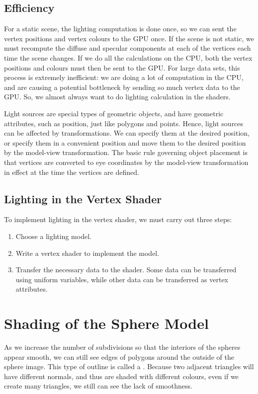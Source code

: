 \documentclass[../COS3712_Notes.tex]{subfiles}
\begin{document}
      \subsection{Efficiency}
        For a static scene, the lighting computation is done once, so we can sent the vertex
        positions and vertex colours to the GPU once.
        If the scene is not static, we must recompute the diffuse and specular components
        at each of the vertices each time the scene changes.
        If we do all the calculations on the CPU, both the vertex positions and colours
        must then be sent to the GPU.
        For large data sets, this process is extremely inefficient:
        we are doing a lot of computation in the CPU, and are causing a potential bottleneck
        by sending so much vertex data to the GPU.
        So, we almost always want to do lighting calculation in the shaders.

        Light sources are special types of geometric objects, and have geometric attributes,
        such as position, just like polygons and points.
        Hence, light sources can be affected by transformations.
        We can specify them at the desired position, or specify them in a convenient position
        and move them to the desired position by the model-view transformation.
        The basic rule governing object placement is that vertices are converted to eye
        coordinates by the model-view transformation in effect at the time the vertices
        are defined.

      \subsection{Lighting in the Vertex Shader}
        To implement lighting in the vertex shader, we must carry out three steps:
        \begin{enumerate}[nosep]
          \item Choose a lighting model.
          \item Write a vertex shader to implement the model.
          \item Transfer the necessary data to the shader.
            Some data can be transferred using uniform variables,
            while other data can be transferred as vertex attributes.
        \end{enumerate}

    \section{Shading of the Sphere Model}
      As we increase the number of subdivisions so that the interiors of the spheres
      appear smooth, we can still see edges of polygons around the outside of the sphere image.
      This type of outline is called a .
      Because two adjacent triangles will have different normals, and thus are shaded with
      different colours, even if we create many triangles, we still can see the lack of smoothness.
\end{document}
